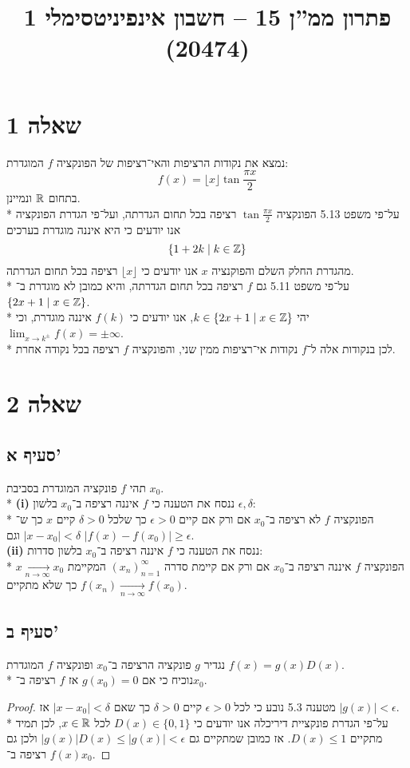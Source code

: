 
\title{פתרון ממ''ן 15 – חשבון אינפיניטסימלי 1 (20474)}


\maketitle
\section{שאלה 1}
נמצא את נקודות הרציפות והאי־רציפות של הפונקציה $f$ המוגדרת:
\[
	f(x) = \lfloor x \rfloor \tan \frac{\pi x}{2}
\]
בתחום $\mathbb{R}$ ונמיינן. \\*
על־פי משפט 5.13 הפונקציה $\tan \frac{\pi x}{2}$ רציפה בכל תחום הגדרתה, ועל־פי הגדרת הפונקציה אנו יודעים כי היא איננה מוגדרת בערכים
\[
	\left\{ 1 + 2k \mid k \in \mathbb{Z} \right\}
\]
מהגדרת החלק השלם והפוקנציה $x$ אנו יודעים כי $\lfloor x \rfloor$ רציפה בכל תחום הגדרתה. \\*
על־פי משפט 5.11 גם $f$ רציפה בכל תחום הגדרתה, והיא כמובן לא מוגדרת ב־$\{ 2x + 1 \mid x \in \mathbb{Z}\}$. \\*
יהי $k \in \{ 2x + 1 \mid x \in \mathbb{Z} \}$, אנו יודעים כי $f(k)$ איננה מוגדרת, וכי $\lim_{x \to k^\pm} f(x) = \pm \infty$. \\*
לכן בנקודות אלה ל־$f$ נקודות אי־רציפות ממין שני, והפונקציה $f$ רציפה בכל נקודה אחרת.

\section{שאלה 2}
\subsection{סעיף א'}
תהי $f$ פונקציה המוגדרת בסביבת $x_0$. \\*
\textbf{(i)}
ננסח את הטענה כי $f$ איננה רציפה ב־$x_0$ בלשון $\epsilon, \delta$: \\*
הפונקציה $f$ לא רציפה ב־$x_0$ אם ורק אם קיים $\epsilon > 0$ כך שלכל $\delta > 0$ קיים $x$ כך ש־$|x - x_0| < \delta$ וגם $|f(x) - f(x_0)| \ge \epsilon$. \\
\textbf{(ii)}
ננסח את הטענה כי $f$ איננה רציפה ב־$x_0$ בלשון סדרות: \\*
הפונקציה $f$ איננה רציפה ב־$x_0$ אם ורק אם קיימת סדרה ${(x_n)}_{n = 1}^\infty$ המקיימת $x \underset{n \to \infty}{\rightarrow} x_0$
כך שלא מתקיים $f(x_n) \underset{n \to \infty}{\rightarrow} f(x_0)$.

\subsection{סעיף ב'}
נגדיר $g$ פונקציה הרציפה ב־$x_0$ ופונקציה $f$ המוגדרת $f(x) = g(x) D(x)$. \\*
נוכיח כי אם $g(x_0) = 0$ אז $f$ רציפה ב־$x_0$.
\begin{proof}
	מטענה 5.3 נובע כי לכל $\epsilon > 0$ קיים $\delta > 0$ כך שאם $|x - x_0| < \delta$ אז $|g(x)| < \epsilon$. \\*
	על־פי הגדרת פונקציית דיריכלה אנו יודעים כי $D(x) \in \{0, 1\}$ לכל $x \in \mathbb{R}$,
	לכן תמיד מתקיים $D(x) \le 1$. אז כמובן שמתקיים גם $|g(x)| D(x) \le |g(x)| < \epsilon$ ולכן גם $f(x)$ רציפה ב־$x_0$.
\end{proof}

